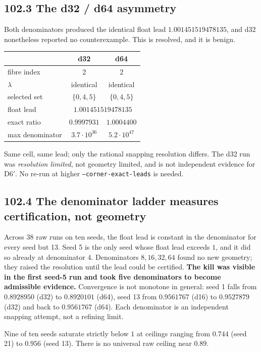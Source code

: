 \documentclass[9pt,twocolumn]{article}
\renewcommand{\_}{\CIGunderscore\allowbreak}
\begin{document}
\subsection*{102.3 The d32 / d64 asymmetry}
Both denominators produced the identical float lead $1.001451519478135$, and d32 nonetheless reported no counterexample. This is resolved, and it is benign.
\begin{center}\scriptsize
\begin{tabularx}{0.98\columnwidth}{Xcc}
\toprule
 & d32 & d64\\
\midrule
fibre index & 2 & 2\\
$\lambda$ & identical & identical\\
selected set & $\{0,4,5\}$ & $\{0,4,5\}$\\
float lead & \multicolumn{2}{c}{$1.001451519478135$}\\
exact ratio & $0.9997931$ & $\mathbf{1.0004400}$\\
max denominator & $3.7\cdot10^{36}$ & $5.2\cdot10^{47}$\\
\bottomrule
\end{tabularx}
\end{center}
Same cell, same lead; only the rational snapping resolution differs. The d32 run was \emph{resolution limited}, not geometry limited, and is not independent evidence for D6$'$. No re-run at higher \texttt{--corner-exact-leads} is needed.

\subsection*{102.4 The denominator ladder measures certification, not geometry}
Across $38$ raw runs on ten seeds, the float lead is constant in the denominator for every seed but 13. Seed 5 is the only seed whose float lead exceeds $1$, and it did so already at denominator $4$. Denominators $8,16,32,64$ found no new geometry; they raised the resolution until the lead could be certified. \textbf{The kill was visible in the first seed-5 run and took five denominators to become admissible evidence.} Convergence is not monotone in general: seed 1 falls from $0.8928950$ (d32) to $0.8920101$ (d64), seed 13 from $0.9561767$ (d16) to $0.9527879$ (d32) and back to $0.9561767$ (d64). Each denominator is an independent snapping attempt, not a refining limit.

Nine of ten seeds saturate strictly below $1$ at ceilings ranging from $0.744$ (seed 21) to $0.956$ (seed 13). There is no universal raw ceiling near $0.89$.
\end{document}
